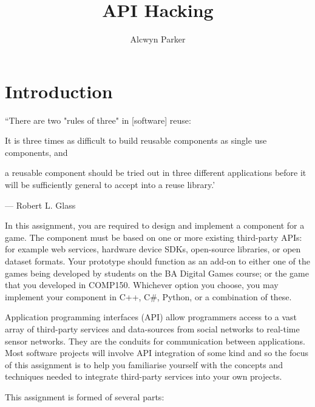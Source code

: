 \documentclass{../fal_assignment}
\title{API Hacking}
\author{Alcwyn Parker}
\begin{document}
\maketitle

\section*{Introduction}

\begin{marginquote}
``There are two "rules of three" in [software] reuse:

It is three times as difficult to build reusable components as single use components, and

a reusable component should be tried out in three different applications before it will be sufficiently general to accept into a reuse library.'
\par ---  Robert L. Glass

\end{marginquote}


In this assignment, you are required to design and implement a component for a game. The component must be based on one or more existing third-party APIs: for example web services, hardware device SDKs, open-source libraries, or open dataset formats. Your prototype should function as an add-on to either one of the games being developed by students on the BA Digital Games course; or the game that you developed in COMP150. Whichever option you choose, you may implement your component in C++, C\#, Python, or a combination of these. 

Application programming interfaces (API) allow programmers access to a vast array of third-party services and data-sources from social networks to real-time sensor networks. They are the conduits for communication between applications. Most software projects will involve API integration of some kind and so the focus of this assignment is to help you familiarise yourself with the concepts and techniques needed to integrate third-party services into your own projects.

This assignment is formed of several parts:
\end{document}
